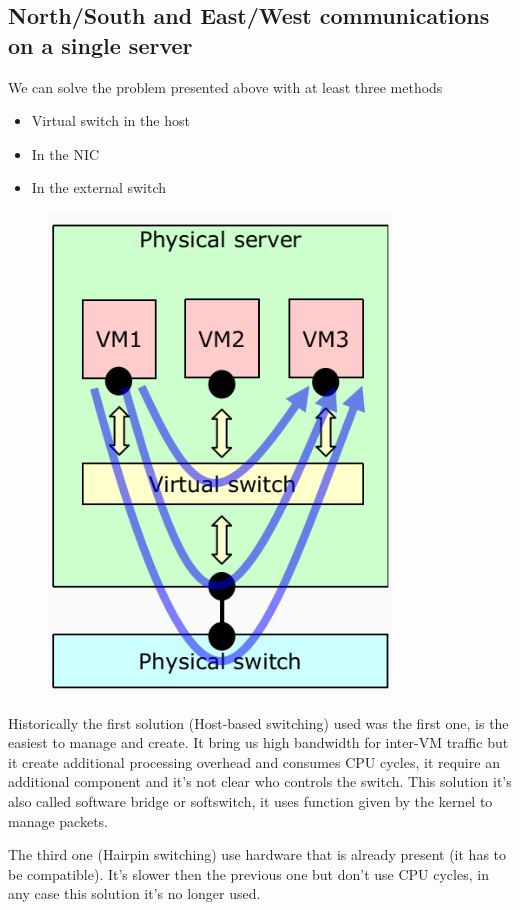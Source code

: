     \subsection{North/South and East/West communications on a single server}
    We can solve the problem presented above with at least three methods
    \begin{itemize}
        \item Virtual switch in the host
        \item In the NIC 
        \item In the external switch
    \end{itemize}   
    \begin{figure}[h!]
        \centering
        \includegraphics[scale=0.25]{images/virtserver.png}
    \end{figure}
    Historically the first solution (Host-based switching) used was the first one, is the easiest to manage and create. It bring us high bandwidth for inter-VM traffic but it create additional processing overhead and consumes CPU cycles, it require an additional component and it's not clear who controls the switch. This solution it's also called software bridge or softswitch, it uses function given by the kernel to manage packets.
    
    The third one (Hairpin switching) use hardware that is already present (it has to be compatible). It's slower then the previous one but don't use CPU cycles, in any case this solution it's no longer used.
    
